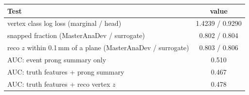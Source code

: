 \begin{tabular}{lc}
\toprule
Test & value \\
\midrule
vertex class log loss (marginal / head) & 1.4239 / 0.9290 \\
snapped fraction (MasterAnaDev / surrogate) & 0.802 / 0.804 \\
reco $z$ within 0.1\,mm of a plane (MasterAnaDev / surrogate) & 0.803 / 0.806 \\
\midrule
AUC: event prong summary only & 0.510 \\
AUC: truth features + prong summary & 0.467 \\
AUC: truth features + reco vertex $z$ & 0.478 \\
\bottomrule
\end{tabular}
